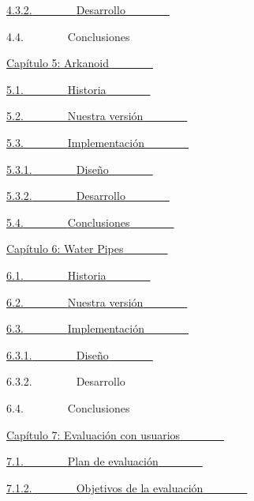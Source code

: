 \hyperref[h.1pxezwc]{4.3.2.}\hyperref[h.1pxezwc]{~~~~~~~~}\hyperref[h.1pxezwc]{Desarrollo}\hyperref[h.1pxezwc]{~~~~~~~~}

4.4.~~~~~~~~Conclusiones~~~~~~~~

\hyperref[h.2p2csry]{Capítulo 5: Arkanoid}\hyperref[h.2p2csry]{~~~~~~~~}

\hyperref[h.147n2zr]{5.1.}\hyperref[h.147n2zr]{~~~~~~~~}\hyperref[h.147n2zr]{Historia}\hyperref[h.147n2zr]{~~~~~~~~}

\hyperref[h.3o7alnk]{5.2.}\hyperref[h.3o7alnk]{~~~~~~~~}\hyperref[h.3o7alnk]{Nuestra
versión}\hyperref[h.3o7alnk]{~~~~~~~~}

\hyperref[h.23ckvvd]{5.3.}\hyperref[h.23ckvvd]{~~~~~~~~}\hyperref[h.23ckvvd]{Implementación}\hyperref[h.23ckvvd]{~~~~~~~~}

\hyperref[h.ihv636]{5.3.1.}\hyperref[h.ihv636]{~~~~~~~~}\hyperref[h.ihv636]{Diseño}\hyperref[h.ihv636]{~~~~~~~~}

\hyperref[h.32hioqz]{5.3.2.}\hyperref[h.32hioqz]{~~~~~~~~}\hyperref[h.32hioqz]{Desarrollo}\hyperref[h.32hioqz]{~~~~~~~~}

\hyperref[h.41mghml]{5.4.}\hyperref[h.41mghml]{~~~~~~~~}\hyperref[h.41mghml]{Conclusiones}\hyperref[h.41mghml]{~~~~~~~~}

\hyperref[h.2grqrue]{Capítulo 6: Water
Pipes}\hyperref[h.2grqrue]{~~~~~~~~}

\hyperref[h.vx1227]{6.1.}\hyperref[h.vx1227]{~~~~~~~~}\hyperref[h.vx1227]{Historia}\hyperref[h.vx1227]{~~~~~~~~}

\hyperref[h.3fwokq0]{6.2.}\hyperref[h.3fwokq0]{~~~~~~~~}\hyperref[h.3fwokq0]{Nuestra
versión}\hyperref[h.3fwokq0]{~~~~~~~~}

\hyperref[h.1v1yuxt]{6.3.}\hyperref[h.1v1yuxt]{~~~~~~~~}\hyperref[h.1v1yuxt]{Implementación}\hyperref[h.1v1yuxt]{~~~~~~~~}

\hyperref[h.4f1mdlm]{6.3.1.}\hyperref[h.4f1mdlm]{~~~~~~~~}\hyperref[h.4f1mdlm]{Diseño}\hyperref[h.4f1mdlm]{~~~~~~~~}

6.3.2.~~~~~~~~Desarrollo~~~~~~~~

6.4.~~~~~~~~Conclusiones~~~~~~~~

\hyperref[h.3tbugp1]{Capítulo 7: Evaluación con
usuarios}\hyperref[h.3tbugp1]{~~~~~~~~}

\hyperref[h.3tbugp1]{7.1.}\hyperref[h.3tbugp1]{~~~~~~~~}\hyperref[h.3tbugp1]{Plan
de evaluación}\hyperref[h.3tbugp1]{~~~~~~~~}

\hyperref[h.28h4qwu]{7.1.2.}\hyperref[h.28h4qwu]{~~~~~~~~}\hyperref[h.28h4qwu]{Objetivos
de la evaluación}\hyperref[h.28h4qwu]{~~~~~~~~}

